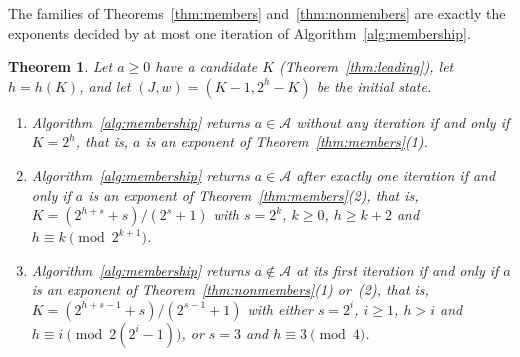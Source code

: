 \documentclass[11pt]{amsart}
\newtheorem{Theorem}{Theorem}[section]
\theoremstyle{definition}
\begin{document}
The families of Theorems~\ref{thm:members} and~\ref{thm:nonmembers} are exactly the exponents decided by at most one iteration of Algorithm~\ref{alg:membership}.

\begin{Theorem}
\label{thm:firststep}
Let $a\ge0$ have a candidate $K$ (Theorem~\ref{thm:leading}), let $h=h(K)$, and let $(J,w)=(K-1,2^h-K)$ be the initial state.
\begin{enumerate}
\item Algorithm~\ref{alg:membership} returns $a\in\mathcal{A}$ without any iteration if and only if $K=2^h$, that is, $a$ is an exponent of Theorem~\ref{thm:members}(1).
\item Algorithm~\ref{alg:membership} returns $a\in\mathcal{A}$ after exactly one iteration if and only if $a$ is an exponent of Theorem~\ref{thm:members}(2), that is, $K=(2^{h+s}+s)/(2^s+1)$ with $s=2^k$, $k\ge0$, $h\ge k+2$ and $h\equiv k\pmod{2^{k+1}}$.
\item Algorithm~\ref{alg:membership} returns $a\notin\mathcal{A}$ at its first iteration if and only if $a$ is an exponent of Theorem~\ref{thm:nonmembers}(1) or~(2), that is, $K=(2^{h+s-1}+s)/(2^{s-1}+1)$ with either $s=2^i$, $i\ge1$, $h>i$ and $h\equiv i\pmod{2(2^i-1)}$, or $s=3$ and $h\equiv3\pmod4$.
\end{enumerate}
\end{Theorem}
\end{document}
